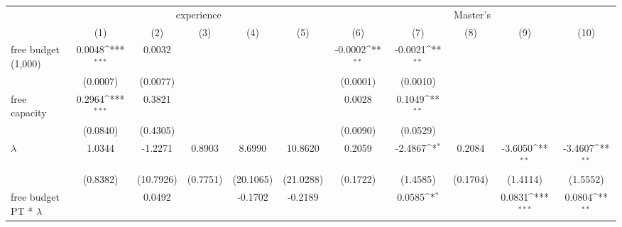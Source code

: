 {
\def\sym#1{\ifmmode^{#1}\else\(^{#1}\)\fi}
\begin{tabular}{l*{10}{c}}
\hline\hline
                    &\multicolumn{5}{c}{experience}                                                                               &\multicolumn{5}{c}{Master's}                                                                                 \\\cmidrule(lr){2-6}\cmidrule(lr){7-11}
                    &\multicolumn{1}{c}{(1)}         &\multicolumn{1}{c}{(2)}         &\multicolumn{1}{c}{(3)}         &\multicolumn{1}{c}{(4)}         &\multicolumn{1}{c}{(5)}         &\multicolumn{1}{c}{(6)}         &\multicolumn{1}{c}{(7)}         &\multicolumn{1}{c}{(8)}         &\multicolumn{1}{c}{(9)}         &\multicolumn{1}{c}{(10)}         \\
\hline
free budget (1,000) &      0.0048\sym{***}&      0.0032         &                     &                     &                     &     -0.0002\sym{**} &     -0.0021\sym{**} &                     &                     &                     \\
                    &    (0.0007)         &    (0.0077)         &                     &                     &                     &    (0.0001)         &    (0.0010)         &                     &                     &                     \\
[1em]
free capacity       &      0.2964\sym{***}&      0.3821         &                     &                     &                     &      0.0028         &      0.1049\sym{**} &                     &                     &                     \\
                    &    (0.0840)         &    (0.4305)         &                     &                     &                     &    (0.0090)         &    (0.0529)         &                     &                     &                     \\
[1em]
$\lambda$           &      1.0344         &     -1.2271         &      0.8903         &      8.6990         &     10.8620         &      0.2059         &     -2.4867\sym{*}  &      0.2084         &     -3.6050\sym{**} &     -3.4607\sym{**} \\
                    &    (0.8382)         &   (10.7926)         &    (0.7751)         &   (20.1065)         &   (21.0288)         &    (0.1722)         &    (1.4585)         &    (0.1704)         &    (1.4114)         &    (1.5552)         \\
[1em]
free budget PT * $\lambda$&                     &      0.0492         &                     &     -0.1702         &     -0.2189         &                     &      0.0585\sym{*}  &                     &      0.0831\sym{***}&      0.0804\sym{**} \\

\end{tabular}}
